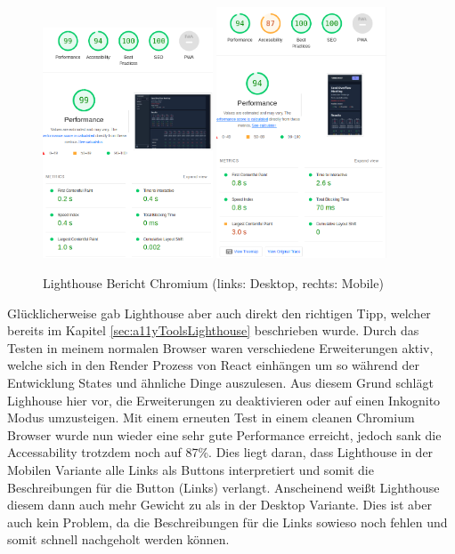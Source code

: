 \begin{figure}[th]
    \centering
    \includegraphics[width=0.45\textwidth]{Figures/lighthouse_desktop_4.png}
    \includegraphics[width=0.45\textwidth]{Figures/lighthouse_mobile_2.png}
    \decoRule
    \caption[Turbomeet Lighthouse Bericht Chromium]{Lighthouse Bericht Chromium (links: Desktop, rechts: Mobile)}
    \label{fig:lighthouse_mobile_2}
\end{figure}

Glücklicherweise gab Lighthouse aber auch direkt den richtigen Tipp, welcher bereits im Kapitel \ref{sec:a11yToolsLighthouse} beschrieben wurde. Durch das Testen in meinem normalen Browser waren verschiedene Erweiterungen aktiv, welche sich in den Render Prozess von React einhängen um so während der Entwicklung States und ähnliche Dinge auszulesen. Aus diesem Grund schlägt Lighhouse hier vor, die Erweiterungen zu deaktivieren oder auf einen Inkognito Modus umzusteigen. Mit einem erneuten Test in einem cleanen Chromium Browser wurde nun wieder eine sehr gute Performance erreicht, jedoch sank die Accessability trotzdem noch auf 87\%. Dies liegt daran, dass Lighthouse in der Mobilen Variante alle Links als Buttons interpretiert und somit die Beschreibungen für die Button (Links) verlangt. Anscheinend weißt Lighthouse diesem dann auch mehr Gewicht zu als in der Desktop Variante. Dies ist aber auch kein Problem, da die Beschreibungen für die Links sowieso noch fehlen und somit schnell nachgeholt werden können.

